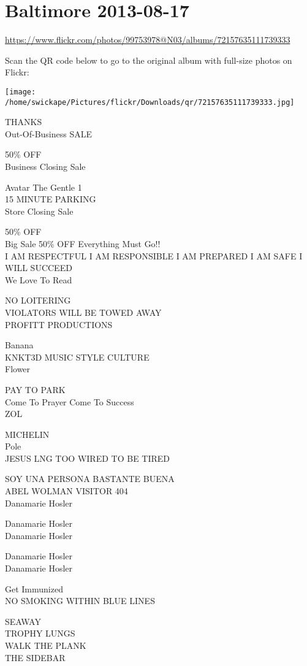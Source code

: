\documentclass[10pt,letterpaper]{article}
\begin{document}
\section*{Baltimore 2013-08-17}

\url{https://www.flickr.com/photos/99753978@N03/albums/72157635111739333}

Scan the QR code below to go to the original album with full-size photos on Flickr:

\texttt{[image: /home/swickape/Pictures/flickr/Downloads/qr/72157635111739333.jpg]}
\pagebreak

THANKS\\
Out{-}Of{-}Business SALE

50\% OFF\\
Business Closing Sale

Avatar The Gentle 1\\
15 MINUTE PARKING\\
Store Closing Sale

50\% OFF\\
Big Sale 50\% OFF Everything Must Go!!\\
I AM RESPECTFUL I AM RESPONSIBLE I AM PREPARED I AM SAFE I WILL SUCCEED\\
We Love To Read

NO LOITERING\\
VIOLATORS WILL BE TOWED AWAY\\
PROFITT PRODUCTIONS

Banana\\
KNKT3D MUSIC STYLE CULTURE\\
Flower

PAY TO PARK\\
Come To Prayer Come To Success\\
ZOL

MICHELIN\\
Pole\\
JESUS LNG TOO WIRED TO BE TIRED

SOY UNA PERSONA BASTANTE BUENA\\
ABEL WOLMAN VISITOR 404\\
Danamarie Hosler

Danamarie Hosler\\
Danamarie Hosler

Danamarie Hosler\\
Danamarie Hosler

Get Immunized\\
NO SMOKING WITHIN BLUE LINES

SEAWAY\\
TROPHY LUNGS\\
WALK THE PLANK\\
THE SIDEBAR
\end{document}
